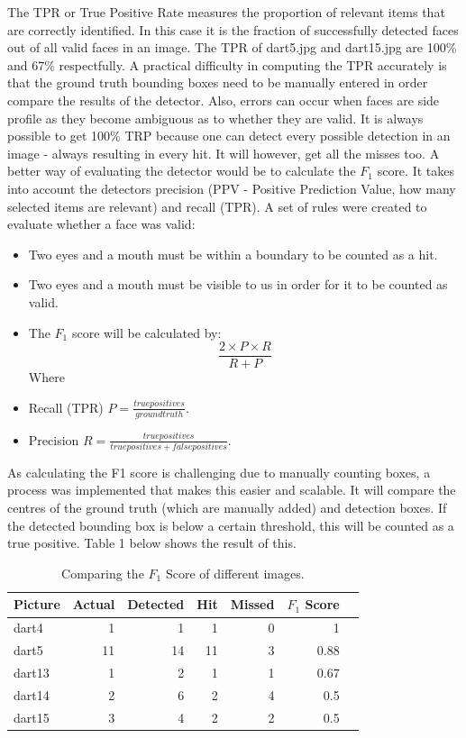 \documentclass[a4paper]{article}
\begin{document}
The TPR or True Positive Rate measures the proportion of relevant items that
are correctly identified. In this case it is the fraction of successfully
detected faces out of all valid faces in an image. The TPR of dart5.jpg and
dart15.jpg are 100\% and 67\% respectfully. A practical difficulty in computing
the TPR accurately is that the ground truth bounding boxes need to be manually
entered in order compare the results of the detector. Also, errors can occur
when faces are side profile as they become ambiguous as to whether they are
valid. It is always possible to get 100\% TRP because one can detect every
possible detection in an image - always resulting in every hit. It will
however, get all the misses too. A better way of evaluating the detector would
be to calculate the \(F_{1}\) score. It takes into account the detectors
precision (PPV - Positive Prediction Value, how many selected items are
relevant) and recall (TPR). A set of rules were created to evaluate whether a
face was valid:


\begin{itemize}
  \item Two eyes and a mouth must be within a boundary to be counted as a hit.
  \item Two eyes and a mouth must be visible to us in order for it to be
    counted as valid.
  \item The \(F_{1}\) score will be calculated by: \[\frac{2 \times P \times
    R}{R + P}\] Where
  \item Recall (TPR) ${P = \frac{true positives}{ground truth}}$.
  \item Precision ${R = \frac{true positives}{true positives + false
    positives}}$.
\end{itemize}

As calculating the F1 score is challenging due to manually counting boxes, a
process was implemented that makes this easier and scalable. It will compare
the centres of the ground truth (which are manually added) and detection boxes.
If the detected bounding box is below a certain threshold, this will be counted
as a true positive. Table 1 below shows the result of this.

\begin{table} [H]
\centering
\begin{tabular}{l| r | r | r | r | r | r}
Picture & Actual & Detected & Hit & Missed & \(F_{1}\) Score \\\hline
dart4 & 1 & 1 & 1 & 0 & 1\\
dart5 & 11 & 14 & 11 & 3 & 0.88 \\
dart13 & 1 & 2 & 1 & 1 & 0.67 \\
dart14 & 2 & 6 & 2 & 4 & 0.5 \\
dart15 & 3 & 4 & 2 & 2 & 0.5
\end{tabular}
\caption{\label{tab:F1}Comparing the \(F_{1}\) Score of different images.}
\end{table}
\end{document}

